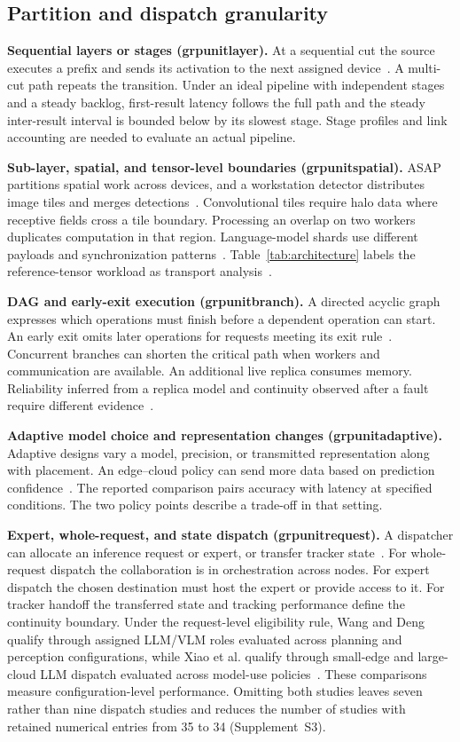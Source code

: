 \documentclass[pdflatex,sn-vancouver-num]{sn-jnl}
\newcommand{\groupcite}[2]{\csname grp#1#2\endcsname}
\begin{document}
\subsection{Partition and dispatch granularity}
\textbf{Sequential layers or stages (\groupcite{unit}{layer}).}
At a sequential cut the source executes a prefix and sends its activation to the next assigned device~\cite{R0010,R0092}. A multi-cut path repeats the transition. Under an ideal pipeline with independent stages and a steady backlog, first-result latency follows the full path and the steady inter-result interval is bounded below by its slowest stage. Stage profiles and link accounting are needed to evaluate an actual pipeline.

\textbf{Sub-layer, spatial, and tensor-level boundaries (\groupcite{unit}{spatial}).}
ASAP partitions spatial work across devices, and a workstation detector distributes image tiles and merges detections~\cite{R0014,R0125}. Convolutional tiles require halo data where receptive fields cross a tile boundary. Processing an overlap on two workers duplicates computation in that region. Language-model shards use different payloads and synchronization patterns~\cite{R0074}. Table~\ref{tab:architecture} labels the reference-tensor workload as transport analysis~\cite{R0121}.

\textbf{DAG and early-exit execution (\groupcite{unit}{branch}).}
A directed acyclic graph expresses which operations must finish before a dependent operation can start. An early exit omits later operations for requests meeting its exit rule~\cite{R0075}. Concurrent branches can shorten the critical path when workers and communication are available. An additional live replica consumes memory. Reliability inferred from a replica model and continuity observed after a fault require different evidence~\cite{R0110,R0121}.

\textbf{Adaptive model choice and representation changes (\groupcite{unit}{adaptive}).}
Adaptive designs vary a model, precision, or transmitted representation along with placement. An edge--cloud policy can send more data based on prediction confidence~\cite{R0080}. The reported comparison pairs accuracy with latency at specified conditions. The two policy points describe a trade-off in that setting.

\textbf{Expert, whole-request, and state dispatch (\groupcite{unit}{request}).}
A dispatcher can allocate an inference request or expert, or transfer tracker state~\cite{R0058,R0118,R0292}. For whole-request dispatch the collaboration is in orchestration across nodes. For expert dispatch the chosen destination must host the expert or provide access to it. For tracker handoff the transferred state and tracking performance define the continuity boundary. Under the request-level eligibility rule, Wang and Deng qualify through assigned LLM/VLM roles evaluated across planning and perception configurations, while Xiao et al. qualify through small-edge and large-cloud LLM dispatch evaluated across model-use policies~\cite{R0223,R0145}. These comparisons measure configuration-level performance. Omitting both studies leaves seven rather than nine dispatch studies and reduces the number of studies with retained numerical entries from 35 to 34 (Supplement~S3).
\end{document}

